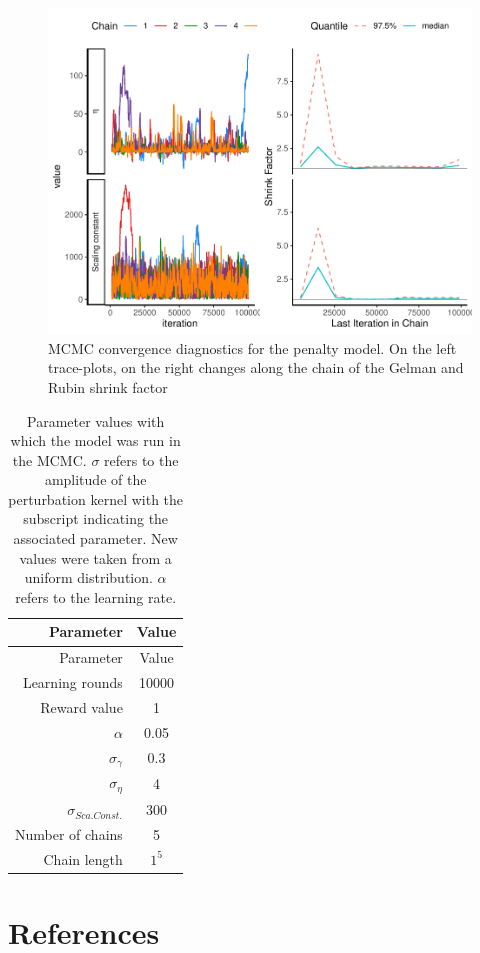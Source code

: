 \documentclass[
  12pt,
]{article}
\begin{document}
\begin{figure}
\includegraphics[width=1\linewidth]{manuscript_BE_files/figure-latex/diagNegPAA-1} \caption{MCMC convergence diagnostics for the penalty model. On the left trace-plots, on the right changes along the chain of the Gelman and Rubin shrink factor}\label{fig:diagNegPAA}
\end{figure}

\begin{longtable}[]{@{}rc@{}}
\caption{\label{tab:param} Parameter values with which the model was run
in the MCMC. \(\sigma\) refers to the amplitude of the perturbation
kernel with the subscript indicating the associated parameter. New
values were taken from a uniform distribution. \(\alpha\) refers to the
learning rate.}\tabularnewline
\toprule()
Parameter & Value \\
\midrule()
\endfirsthead
\toprule()
Parameter & Value \\
\midrule()
\endhead
Learning rounds & 10000 \\
Reward value & 1 \\
\(\alpha\) & 0.05 \\
\(\sigma_{\gamma}\) & 0.3 \\
\(\sigma_{\eta}\) & 4 \\
\(\sigma_{Sca.Const.}\) & 300 \\
Number of chains & 5 \\
Chain length & \(1^5\) \\
\bottomrule()
\end{longtable}

\hypertarget{references}{%
\section*{References}\label{references}}
\end{document}
